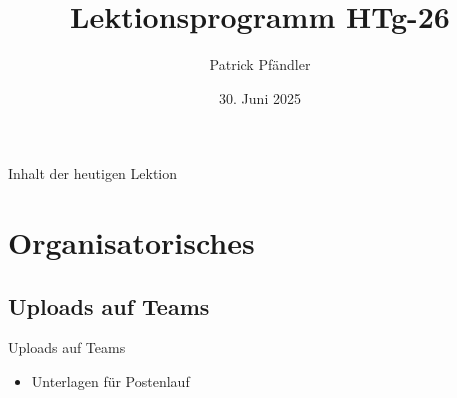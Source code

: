 



\title{\textbf{Lektionsprogramm HTg-26}}
\author{Patrick Pfändler}
\date{30. Juni   2025}




\frame{\titlepage}





\begin{frame}{Inhalt der heutigen Lektion}
    \tableofcontents
\end{frame}


\section{Organisatorisches}
\BlueSectionSlide

\subsection{Uploads auf Teams}
\begin{frame}{Uploads auf Teams}
    \begin{itemize}
        \item[\textbullet] Unterlagen für Postenlauf
    \end{itemize}

\end{frame}




